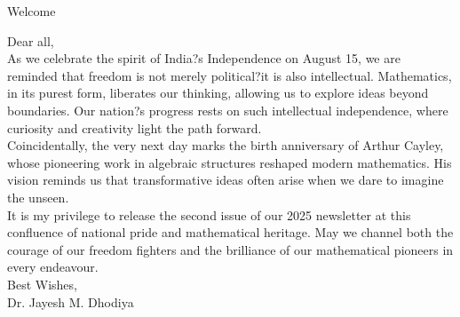 \newpage
\begin{tcolorbox}[enhanced,
  colback=blue!50!white, colframe=blue!25!black, coltext=white,
  fontupper=\Large\bfseries, arc=8mm, boxrule=0mm, boxsep=4mm]
  {\sffamily\LARGE Welcome} \label{Welcome}
\end{tcolorbox}


    \begin{minipage}{0.3\textwidth}
      \begin{center}
        \vspace{4cm}
      \end{center}
    \end{minipage}
    \hfill
\begin{minipage}{0.6\textwidth}
{\sffamily\justifying
\noindent

\vspace{1cm}

Dear all,\\

As we celebrate the spirit of India?s Independence on August 15, we are reminded that freedom is not merely political?it is also intellectual. Mathematics, in its purest form, liberates our thinking, allowing us to explore ideas beyond boundaries. Our nation?s progress rests on such intellectual independence, where curiosity and creativity light the path forward.\\

Coincidentally, the very next day marks the birth anniversary of Arthur Cayley, whose pioneering work in algebraic structures reshaped modern mathematics. His vision reminds us that transformative ideas often arise when we dare to imagine the unseen.\\

It is my privilege to release the second issue of our 2025 newsletter at this confluence of national pride and mathematical heritage. May we channel both the courage of our freedom fighters and the brilliance of our mathematical pioneers in every endeavour.\\

\noindent
 Best Wishes,\\
Dr. Jayesh M. Dhodiya}
\end{minipage}


